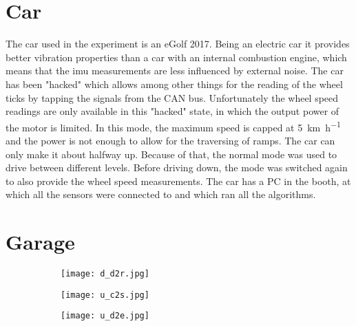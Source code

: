 \section{Car}
The car used in the experiment is an eGolf 2017.
Being an electric car it provides better vibration properties than a car with an internal combustion engine, which means that the \gls{imu} measurements are less influenced by external noise.
The car has been "hacked" which allows among other things for the reading of the wheel ticks by tapping the signals from the CAN bus.
Unfortunately the wheel speed readings are only available in this "hacked" state, in which the output power of the motor is limited.
In this mode, the maximum speed is capped at \SI{5}{\kilo\metre\per\hour} and the power is not enough to allow for the traversing of ramps.
The car can only make it about halfway up.
Because of that, the normal mode was used to drive between different levels.
Before driving down, the mode was switched again to also provide the wheel speed measurements.
The car has a PC in the booth, at which all the sensors were connected to and which ran all the algorithms.



\section{Garage}
\begin{figure}
	\begin{subfigure}{.3\linewidth}
		\centering
		\texttt{[image: d\_d2r.jpg]}
	\end{subfigure}
	\hfill
	\begin{subfigure}{.3\linewidth}
		\centering
		\texttt{[image: u\_c2s.jpg]}
	\end{subfigure}
	\hfill
	\begin{subfigure}{.3\linewidth}
		\centering
		\texttt{[image: u\_d2e.jpg]}
	\end{subfigure}
\end{figure}